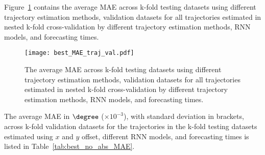 
Figure~\ref{fig:best_MAE_traj_val} contains the average MAE across k-fold testing datasets using different trajectory estimation methods, validation datasets for all trajectories estimated in nested k-fold cross-validation by different trajectory estimation methods, RNN models, and forecasting times.

\begin{figure}[!ht]
	\centering
	\texttt{[image: best\_MAE\_traj\_val.pdf]}
	\caption{The average MAE across k-fold testing datasets using different trajectory estimation methods, validation datasets for all trajectories estimated in nested k-fold cross-validation by different trajectory estimation methods, RNN models, and forecasting times.}
	\label{fig:best_MAE_traj_val}
\end{figure}

The average MAE in $\degree$ ($\times 10^{-3}$), with standard deviation in brackets, across k-fold validation datasets for the trajectories in the k-fold testing datasets estimated using $x$ and $y$ offset, different RNN models, and forecasting times is listed in Table~\ref{tab:best_no_abs_MAE}.

\begin{table}[!ht]
	\centering
	\caption{The average MAE in $\degree$ ($\times 10^{-3}$), with standard deviation in brackets, across k-fold validation datasets for the trajectories in the k-fold testing datasets estimated using $x$ and $y$ offset, different RNN models, and forecasting times.}
	\label{tab:best_no_abs_MAE}
\end{table}

